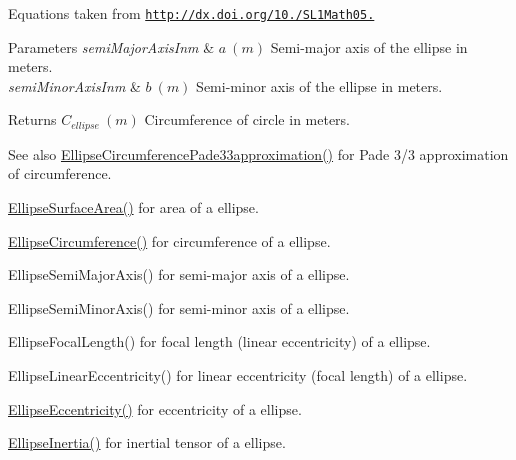Equations taken from \href{http://dx.doi.org/10.3247/SL1Math05.004}{\tt http\+://dx.\+doi.\+org/10./\+S\+L1\+Math05.} 
\begin{DoxyParams}{Parameters}
{\em semi\+Major\+Axis\+Inm} & $ a\ (m)$ Semi-\/major axis of the ellipse in meters. \\
\hline
{\em semi\+Minor\+Axis\+Inm} & $ b\ (m)$ Semi-\/minor axis of the ellipse in meters. \\
\hline
\end{DoxyParams}
\begin{DoxyReturn}{Returns}
$ C_{ellipse}\ (m)$ Circumference of circle in meters. 
\end{DoxyReturn}
\begin{DoxySeeAlso}{See also}
\mbox{\hyperlink{group___e_g_x_math-_geometry-2_d-_ellipse_ga0e0b290f1da2605c16ec13b9e221769d}{Ellipse\+Circumference\+Pade33approximation()}} for Pade 3/3 approximation of circumference. 

\mbox{\hyperlink{group___e_g_x_math-_geometry-2_d-_ellipse_ga4ce8c8323e9718ce5458f4ab7f6d823d}{Ellipse\+Surface\+Area()}} for area of a ellipse. 

\mbox{\hyperlink{group___e_g_x_math-_geometry-2_d-_ellipse_ga4172802ac674eb53467b44928ac635c7}{Ellipse\+Circumference()}} for circumference of a ellipse. 

Ellipse\+Semi\+Major\+Axis() for semi-\/major axis of a ellipse. 

Ellipse\+Semi\+Minor\+Axis() for semi-\/minor axis of a ellipse. 

Ellipse\+Focal\+Length() for focal length (linear eccentricity) of a ellipse. 

Ellipse\+Linear\+Eccentricity() for linear eccentricity (focal length) of a ellipse. 

\mbox{\hyperlink{group___e_g_x_math-_geometry-2_d-_ellipse-_eccentricity_ga6a0a7fba17f782616894cfc447628c33}{Ellipse\+Eccentricity()}} for eccentricity of a ellipse. 

\mbox{\hyperlink{group___e_g_x_math-_geometry-2_d-_ellipse_gad679a65dc7550e27dc69c1d328c94732}{Ellipse\+Inertia()}} for inertial tensor of a ellipse. 
\end{DoxySeeAlso}
\mbox{\label{group___e_g_x_math-_geometry-2_d-_ellipse_ga10a3049c2f04b50f271fb01dc62e4cf8}} 
